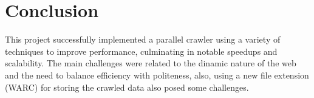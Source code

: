 \section{Conclusion}

This project successfully implemented a parallel crawler using a variety of techniques to improve performance, culminating in notable speedups and scalability. The main challenges were related to the dinamic nature of the web and the need to balance efficiency with politeness, also, using a new file extension (WARC) for storing the crawled data also posed some challenges.









